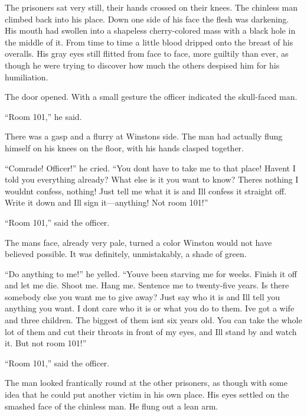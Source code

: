 The prisoners sat very still, their hands crossed on their knees. The
chinless man climbed back into his place. Down one side of his face the
flesh was darkening. His mouth had swollen into a shapeless
cherry-colored mass with a black hole in the middle of it. From time to
time a little blood dripped onto the breast of his overalls. His gray
eyes still flitted from face to face, more guiltily than ever, as though
he were trying to discover how much the others despised him for his
humiliation.

The door opened. With a small gesture the officer indicated the
skull-faced man.

``Room 101,'' he said.

There was a gasp and a flurry at Winston\textquotesingle s side. The man
had actually flung himself on his knees on the floor, with his hands
clasped together.

``Comrade! Officer!'' he cried. ``You don\textquotesingle t have to take me
to that place! Haven\textquotesingle t I told you everything already?
What else is it you want to know? There\textquotesingle s nothing I
wouldn\textquotesingle t confess, nothing! Just tell me what it is and
I\textquotesingle ll confess it straight off. Write it down and
I\textquotesingle ll sign it---anything! Not room 101!''

``Room 101,'' said the officer.

The man\textquotesingle s face, already very pale, turned a color
Winston would not have believed possible. It was definitely,
unmistakably, a shade of green.

``Do anything to me!'' he yelled. ``You\textquotesingle ve been starving me
for weeks. Finish it off and let me die. Shoot me. Hang me. Sentence me
to twenty-five years. Is there somebody else you want me to give away?
Just say who it is and I\textquotesingle ll tell you anything you want.
I don\textquotesingle t care who it is or what you do to them.
I\textquotesingle ve got a wife and three children. The biggest of them
isn\textquotesingle t six years old. You can take the whole lot of them
and cut their throats in front of my eyes, and I\textquotesingle ll
stand by and watch it. But not room 101!''

``Room 101,'' said the officer.

The man looked frantically round at the other prisoners, as though with
some idea that he could put another victim in his own place. His eyes
settled on the smashed face of the chinless man. He flung out a lean
arm.

